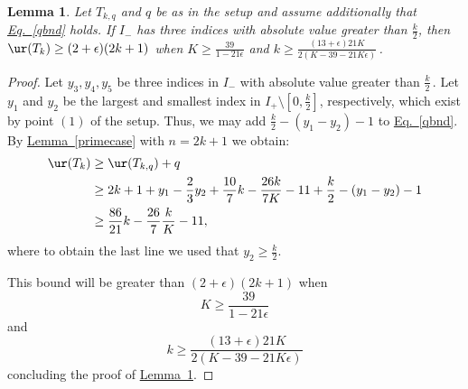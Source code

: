 \documentclass[11pt]{article}
\newcommand{\expref}[2]{\texorpdfstring{\hyperref[#2]{#1~\ref{#2}}}{#1~\ref{#2}}}
\newcommand{\expeqref}[2]{\texorpdfstring{\hyperref[#2]{#1~\eqref{#2}}}{#1~\eqref{#2}}}
\newtheorem{lemma}[theorem]{Lemma}
\begin{document}
\begin{lemma} \label{lem:far}  Let $T_{k,q}$ and $q$ be as in the setup and assume
additionally that \expeqref{Eq.}{qbnd} holds.
If  $I_{-}$ has three indices with absolute value greater than $\frac{k}{2}$,
then
$\ur(T_k)\geq (2+\epsilon)(2k+1)$ when
$ K\geq \frac{39}{1-21\epsilon}$ 
and
$ 
k\geq \frac{(13+\epsilon)21K}{2(K-39-21K\epsilon)}
$\,.
\end{lemma}
\begin{proof}
Let $y_3,y_4,y_5$ be   three indices in $I_{-}$ with absolute value greater
than $\frac{k}{2}$\,. Let 
$y_1$ and $y_2$ be %
the largest and smallest index in $I_{+}\setminus [0, \frac{k}{2} ]$,
respectively,  %
which exist by point $(1)$ of the %
setup.  %
Thus, we may add
$\frac k2-(y_1-y_2)-1$ to \expeqref{Eq.}{qbnd}. 
By \expref{Lemma}{primecase} with $n=2k+1$ we obtain:
\begin{align*}\ur(T_k)&\geq \ur(T_{k,q})+q\\
&\geq 
2k+1+y_1-\frac{2}{3}y_2+\frac{10}{7}k-\frac{26k}{7K}-11+\frac{k}{2}-(y_1-y_2)-1\\
&\geq \frac{86}{21}k-\frac{26}{7}\frac kK-11,
\end{align*}
where to obtain the last  line we used that $y_2\geq \frac{k}{2}$.

This bound will be greater than $(2+\epsilon)(2k+1)$ when
$$
K\geq 
\frac{39}{1-21\epsilon}
$$
and
$$
k\geq\frac{(13+\epsilon)21K}{2(K-39-21K\epsilon)}
$$
%
%
concluding the proof of 
\expref{Lemma}{lem:far}. %
\end{proof}
\end{document}
